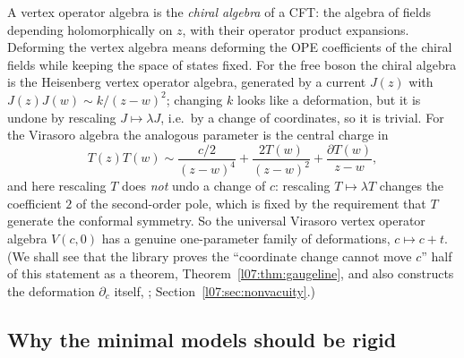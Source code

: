 A vertex operator algebra is the \emph{chiral algebra} of a CFT: the algebra of fields depending
holomorphically on $z$, with their operator product expansions. Deforming the vertex algebra
means deforming the OPE coefficients of the chiral fields while keeping the space of states fixed.
For the free boson the chiral algebra is the Heisenberg vertex operator algebra, generated by a
current $J(z)$ with $J(z)J(w)\sim k/(z-w)^2$; changing $k$ looks like a deformation, but it is
undone by rescaling $J\mapsto\lambda J$, i.e.\ by a change of coordinates, so it is trivial. For
the Virasoro algebra the analogous parameter is the central charge in
\begin{equation*}
 T(z)T(w)\sim\frac{c/2}{(z-w)^4} + \frac{2T(w)}{(z-w)^2} + \frac{\partial T(w)}{z-w},
\end{equation*}
and here rescaling $T$ does \emph{not} undo a change of $c$: rescaling $T\mapsto\lambda T$ changes
the coefficient $2$ of the second-order pole, which is fixed by the requirement that $T$ generate
the conformal symmetry. So the universal Virasoro vertex operator algebra $V(c,0)$ has a genuine
one-parameter family of deformations, $c\mapsto c+t$. (We shall see that the library proves the
``coordinate change cannot move $c$'' half of this statement as a theorem,
Theorem~\ref{l07:thm:gaugeline}, and also constructs the deformation $\partial_c$ itself,
\allowbreak{}\allowbreak{}; Section~\ref{l07:sec:nonvacuity}.)

\subsection{Why the minimal models should be rigid}

